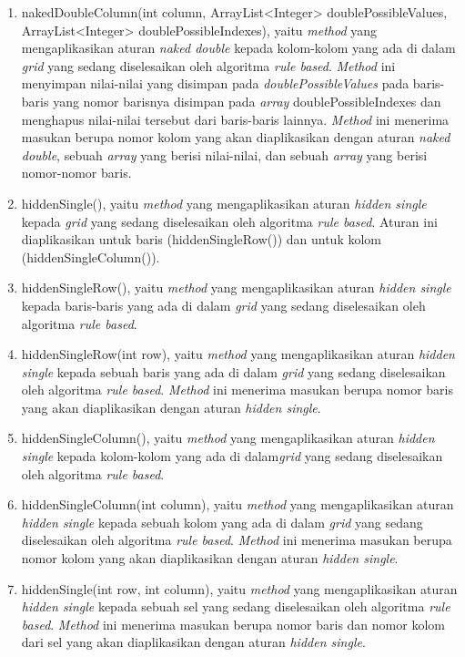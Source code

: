 \begin{enumerate}
\item nakedDoubleColumn(int column, ArrayList<Integer> doublePossibleValues, ArrayList<Integer> doublePossibleIndexes), yaitu \textit{method} yang mengaplikasikan aturan \textit{naked double} kepada kolom-kolom yang ada di dalam \textit{grid} yang sedang diselesaikan oleh algoritma \textit{rule based}. \textit{Method} ini menyimpan nilai-nilai yang disimpan pada \textit{doublePossibleValues} pada baris-baris yang nomor barisnya disimpan pada \textit{array} doublePossibleIndexes dan menghapus nilai-nilai tersebut dari baris-baris lainnya. \textit{Method} ini menerima masukan berupa nomor kolom yang akan diaplikasikan dengan aturan \textit{naked double}, sebuah \textit{array} yang berisi nilai-nilai, dan sebuah \textit{array} yang berisi nomor-nomor baris.
\item hiddenSingle(), yaitu \textit{method} yang mengaplikasikan aturan \textit{hidden single} kepada \textit{grid} yang sedang diselesaikan oleh algoritma \textit{rule based}. Aturan ini diaplikasikan untuk baris (hiddenSingleRow()) dan untuk kolom (hiddenSingleColumn()).
\item hiddenSingleRow(), yaitu \textit{method} yang mengaplikasikan aturan \textit{hidden single} kepada baris-baris yang ada di dalam \textit{grid} yang sedang diselesaikan oleh algoritma \textit{rule based}.
\item hiddenSingleRow(int row), yaitu \textit{method} yang mengaplikasikan aturan \textit{hidden single} kepada sebuah baris yang ada di dalam \textit{grid} yang sedang diselesaikan oleh algoritma \textit{rule based}. \textit{Method} ini menerima masukan berupa nomor baris yang akan diaplikasikan dengan aturan \textit{hidden single}.
\item hiddenSingleColumn(), yaitu \textit{method} yang mengaplikasikan aturan \textit{hidden single} kepada kolom-kolom yang ada di dalam\textit{grid} yang sedang diselesaikan oleh algoritma \textit{rule based}.
\item hiddenSingleColumn(int column), yaitu \textit{method} yang mengaplikasikan aturan \textit{hidden single} kepada sebuah kolom yang ada di dalam \textit{grid} yang sedang diselesaikan oleh algoritma \textit{rule based}. \textit{Method} ini menerima masukan berupa nomor kolom yang akan diaplikasikan dengan aturan \textit{hidden single}.
\item hiddenSingle(int row, int column), yaitu \textit{method} yang mengaplikasikan aturan \textit{hidden single} kepada sebuah sel yang sedang diselesaikan oleh algoritma \textit{rule based}. \textit{Method} ini menerima masukan berupa nomor baris dan nomor kolom dari sel yang akan diaplikasikan dengan aturan \textit{hidden single}.

\end{enumerate}
